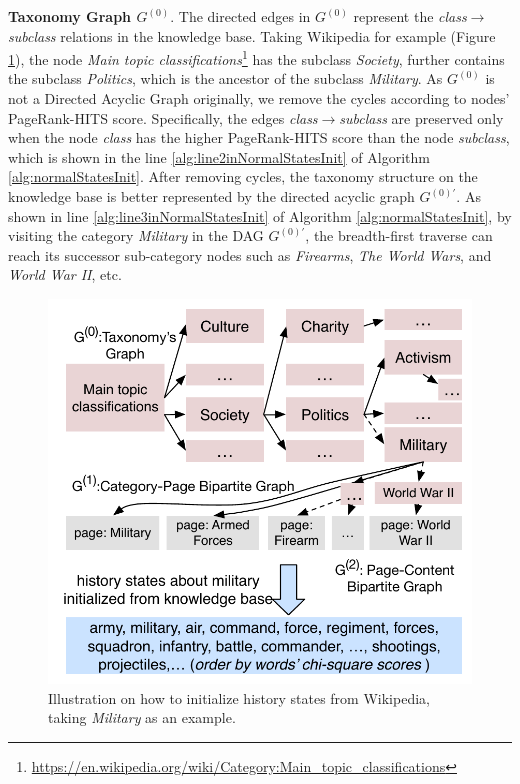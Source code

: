 \documentclass{article}
\begin{document}
\textbf{Taxonomy Graph \(G^{(0)}\)}. The directed edges in \(G^{(0)}\) represent the \textit{class}\(\rightarrow\)\textit{subclass} relations in the knowledge base. 
Taking Wikipedia for example (Figure \ref{fig:NSinitializaton}), the node \textit{Main topic classifications}\footnote{\url{https://en.wikipedia.org/wiki/Category:Main_topic_classifications}} has the subclass \textit{Society}, further contains the subclass \textit{Politics}, which is the ancestor of the subclass \textit{Military}.
As \(G^{(0)}\) is not a Directed Acyclic Graph originally\cite{faralli2015large}, we remove the cycles according to nodes' PageRank-HITS\cite{Yan:2015wq} score.
Specifically, the edges \textit{class}\(\rightarrow\)\textit{subclass} are preserved only when the node \textit{class} has the higher PageRank-HITS score than the node \textit{subclass}, which is shown in the line \ref{alg:line2inNormalStatesInit} of Algorithm \ref{alg:normalStatesInit}.
After removing cycles, the taxonomy structure on the knowledge base is better represented by the directed acyclic graph \(G^{(0)'}\).
As shown in line \ref{alg:line3inNormalStatesInit} of Algorithm \ref{alg:normalStatesInit}, by visiting the category \textit{Military} in the DAG \(G^{(0)'}\), the breadth-first traverse can reach its successor sub-category nodes such as \textit{Firearms}, \textit{The World Wars}, and \textit{World War II}, etc. 
\begin{figure}[h]
    \centering
    \includegraphics[width=.82\columnwidth]{img/initializationExample.pdf}  
    \caption{Illustration on how to initialize history states from Wikipedia, taking \textit{Military} as an example.}
    \label{fig:NSinitializaton}
\end{figure}
\end{document}
